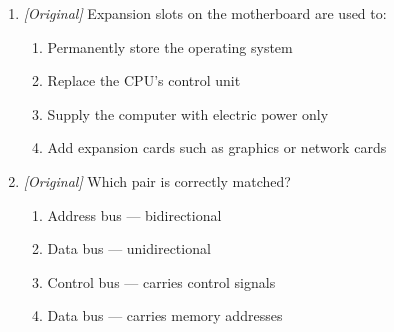 \begin{enumerate}[label=\textbf{Q\arabic*.}, leftmargin=*]
\begin{enumerate}[label=\Alph*.]
    \item I and II only
    \item II and III only
    \item I, II and III
  \end{enumerate}
\item \textit{[Original]} Expansion slots on the motherboard are used to:
  \begin{enumerate}[label=\Alph*.]
    \item Permanently store the operating system
    \item Replace the CPU's control unit
    \item Supply the computer with electric power only
    \item Add expansion cards such as graphics or network cards
  \end{enumerate}
\item \textit{[Original]} Which pair is correctly matched?
  \begin{enumerate}[label=\Alph*.]
    \item Address bus --- bidirectional
    \item Data bus --- unidirectional
    \item Control bus --- carries control signals
    \item Data bus --- carries memory addresses
  \end{enumerate}


\end{enumerate}
